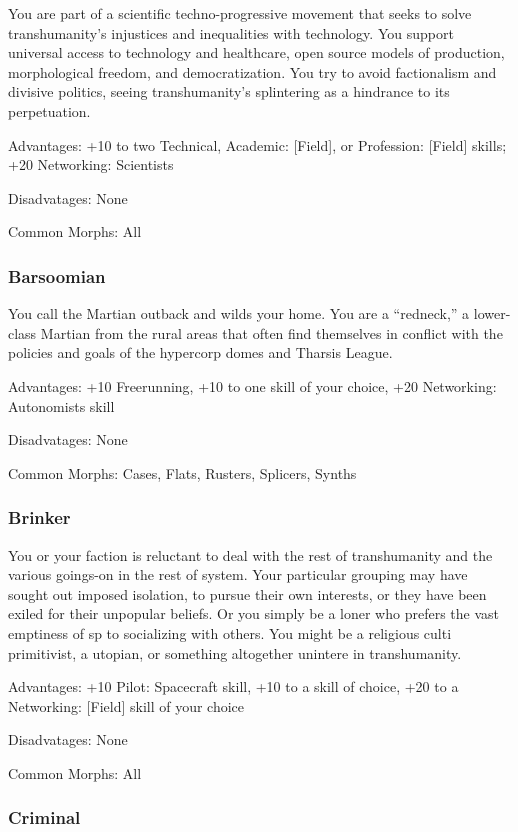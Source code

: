 You are part of a scientific techno-progressive movement that seeks to solve transhumanity’s injustices and inequalities with technology. You support universal access to technology and healthcare, open source models of production, morphological freedom, and democratization. You try to avoid factionalism and divisive politics, seeing transhumanity’s splintering as a hindrance to its perpetuation. 

Advantages: +10 to two Technical, Academic: [Field], or Profession: [Field] skills; +20 Networking: Scientists 

Disadvatages: None 

Common Morphs: All 

\subsubsection{Barsoomian} \label{sec:barsoomian} 

You call the Martian outback and wilds your home. You are a “redneck,” a lower-class Martian from the rural areas that often find themselves in conflict with the policies and goals of the hypercorp domes and Tharsis League. 

Advantages: +10 Freerunning, +10 to one skill of your choice, +20 Networking: Autonomists skill 

Disadvatages: None 

Common Morphs: Cases, Flats, Rusters, Splicers, Synths 

\subsubsection{Brinker} \label{sec:brinker} 

You or your faction is reluctant to deal with the rest of transhumanity and the various goings-on in the rest of system. Your particular grouping may have sought out imposed isolation, to pursue their own interests, or they have been exiled for their unpopular beliefs. Or you simply be a loner who prefers the vast emptiness of sp to socializing with others. You might be a religious culti primitivist, a utopian, or something altogether unintere in transhumanity. 

Advantages: +10 Pilot: Spacecraft skill, +10 to a skill of choice, +20 to a Networking: [Field] skill of your choice 

Disadvatages: None 

Common Morphs: All 

\subsubsection{Criminal} \label{sec:criminal} 

